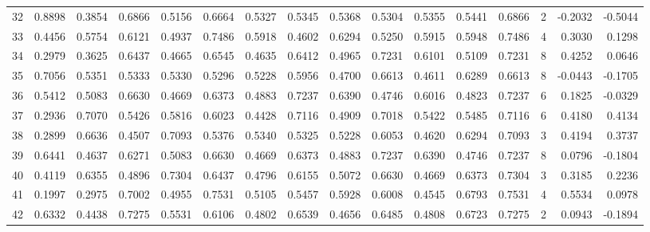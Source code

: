 \begin{tabular}{lrrrrrrrrrrrrrrr}
32  &      0.8898 &  0.3854 &  0.6866 &  0.5156 &  0.6664 &  0.5327 &  0.5345 &  0.5368 &  0.5304 &  0.5355 &   0.5441 &     0.6866 &      2 &                   -0.2032 &                    -0.5044 \\
33  &      0.4456 &  0.5754 &  0.6121 &  0.4937 &  0.7486 &  0.5918 &  0.4602 &  0.6294 &  0.5250 &  0.5915 &   0.5948 &     0.7486 &      4 &                    0.3030 &                     0.1298 \\
34  &      0.2979 &  0.3625 &  0.6437 &  0.4665 &  0.6545 &  0.4635 &  0.6412 &  0.4965 &  0.7231 &  0.6101 &   0.5109 &     0.7231 &      8 &                    0.4252 &                     0.0646 \\
35  &      0.7056 &  0.5351 &  0.5333 &  0.5330 &  0.5296 &  0.5228 &  0.5956 &  0.4700 &  0.6613 &  0.4611 &   0.6289 &     0.6613 &      8 &                   -0.0443 &                    -0.1705 \\
36  &      0.5412 &  0.5083 &  0.6630 &  0.4669 &  0.6373 &  0.4883 &  0.7237 &  0.6390 &  0.4746 &  0.6016 &   0.4823 &     0.7237 &      6 &                    0.1825 &                    -0.0329 \\
37  &      0.2936 &  0.7070 &  0.5426 &  0.5816 &  0.6023 &  0.4428 &  0.7116 &  0.4909 &  0.7018 &  0.5422 &   0.5485 &     0.7116 &      6 &                    0.4180 &                     0.4134 \\
38  &      0.2899 &  0.6636 &  0.4507 &  0.7093 &  0.5376 &  0.5340 &  0.5325 &  0.5228 &  0.6053 &  0.4620 &   0.6294 &     0.7093 &      3 &                    0.4194 &                     0.3737 \\
39  &      0.6441 &  0.4637 &  0.6271 &  0.5083 &  0.6630 &  0.4669 &  0.6373 &  0.4883 &  0.7237 &  0.6390 &   0.4746 &     0.7237 &      8 &                    0.0796 &                    -0.1804 \\
40  &      0.4119 &  0.6355 &  0.4896 &  0.7304 &  0.6437 &  0.4796 &  0.6155 &  0.5072 &  0.6630 &  0.4669 &   0.6373 &     0.7304 &      3 &                    0.3185 &                     0.2236 \\
41  &      0.1997 &  0.2975 &  0.7002 &  0.4955 &  0.7531 &  0.5105 &  0.5457 &  0.5928 &  0.6008 &  0.4545 &   0.6793 &     0.7531 &      4 &                    0.5534 &                     0.0978 \\
42  &      0.6332 &  0.4438 &  0.7275 &  0.5531 &  0.6106 &  0.4802 &  0.6539 &  0.4656 &  0.6485 &  0.4808 &   0.6723 &     0.7275 &      2 &                    0.0943 &                    -0.1894 \\

\end{tabular}
